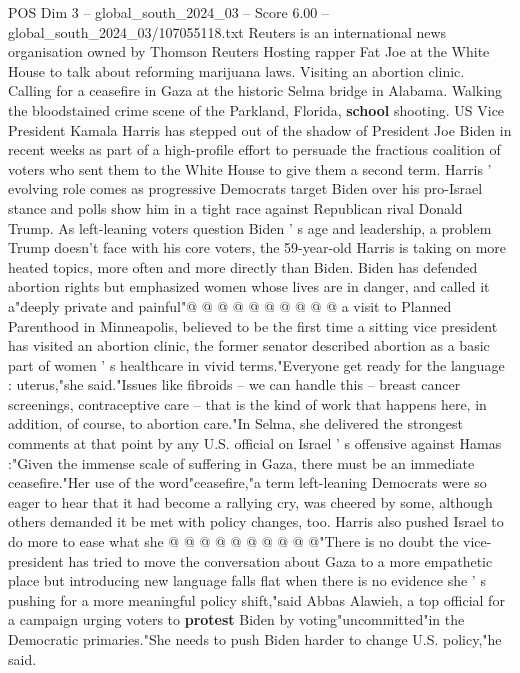 \begin{textsample}{POS Dim 3 – global\_south\_2024\_03 – Score 6.00 – global\_south\_2024\_03/107055118.txt}  \label{ex:f3_pos_425}
Reuters is an international news organisation owned by Thomson Reuters Hosting rapper Fat Joe at the White House to talk about reforming marijuana laws.
Visiting an abortion clinic.
Calling for a ceasefire in Gaza at the historic Selma bridge in Alabama.
Walking the bloodstained crime scene of the Parkland, Florida, \textbf{school} shooting.
US Vice President Kamala Harris has stepped out of the shadow of President Joe Biden in recent weeks as part of a high-profile effort to persuade the fractious coalition of voters who sent them to the White House to give them a second term.
Harris ' evolving role comes as progressive Democrats target Biden over his pro-Israel stance and polls show him in a tight race against Republican rival Donald Trump.
As left-leaning voters question Biden ' s age and leadership, a problem Trump doesn't face with his core voters, the 59-year-old Harris is taking on more heated topics, more often and more directly than Biden.
Biden has defended abortion rights but emphasized women whose lives are in danger, and called it a"deeply private and painful"@ @ @ @ @ @ @ @ @ @ a visit to Planned Parenthood in Minneapolis, believed to be the first time a sitting vice president has visited an abortion clinic, the former senator described abortion as a basic part of women ' s healthcare in vivid terms."Everyone get ready for the language : uterus,"she said."Issues like fibroids -- we can handle this -- breast cancer screenings, contraceptive care -- that is the kind of work that happens here, in addition, of course, to abortion care."In Selma, she delivered the strongest comments at that point by any U.S. official on Israel ' s offensive against Hamas :"Given the immense scale of suffering in Gaza, there must be an immediate ceasefire."Her use of the word"ceasefire,"a term left-leaning Democrats were so eager to hear that it had become a rallying cry, was cheered by some, although others demanded it be met with policy changes, too.
Harris also pushed Israel to do more to ease what she @ @ @ @ @ @ @ @ @ @"There is no doubt the vice-president has tried to move the conversation about Gaza to a more empathetic place but introducing new language falls flat when there is no evidence she ' s pushing for a more meaningful policy shift,"said Abbas Alawieh, a top official for a campaign urging voters to \textbf{protest} Biden by voting"uncommitted"in the Democratic primaries."She needs to push Biden harder to change U.S. policy,"he said.

\end{textsample}
